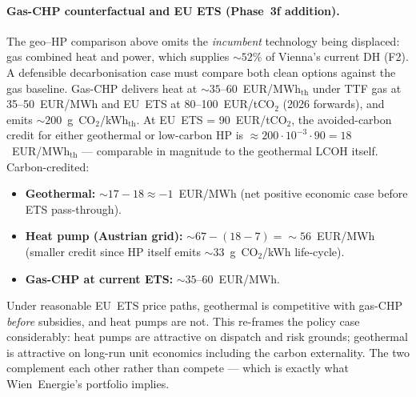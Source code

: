 \documentclass{article}
\begin{document}
\paragraph{Gas-CHP counterfactual and EU ETS (Phase~3f addition).}
The geo--HP comparison above omits the \emph{incumbent} technology
being displaced: gas combined heat and power, which supplies
$\sim 52\%$ of Vienna's current DH (F2). A defensible decarbonisation
case must compare both clean options against the gas baseline.
Gas-CHP delivers heat at $\sim 35$--$60$~EUR/MWh$_{\mathrm{th}}$
under TTF gas at 35--50~EUR/MWh and EU~ETS at 80--100~EUR/tCO$_2$
(2026 forwards), and emits $\sim 200$~g~CO$_2$/kWh$_{\mathrm{th}}$.
At EU~ETS = 90~EUR/tCO$_2$, the avoided-carbon credit for either
geothermal or low-carbon HP is $\approx 200 \cdot 10^{-3}
\cdot 90 = 18$~EUR/MWh$_{\mathrm{th}}$ --- comparable in magnitude
to the geothermal LCOH itself. Carbon-credited:
\begin{itemize}
\item \textbf{Geothermal:} $\sim 17 - 18 \approx -1$~EUR/MWh
(net positive economic case before ETS pass-through).
\item \textbf{Heat pump (Austrian grid):} $\sim 67 - (18 - 7) =
\sim 56$~EUR/MWh (smaller credit since HP itself emits
$\sim 33$~g~CO$_2$/kWh life-cycle).
\item \textbf{Gas-CHP at current ETS:} $\sim 35$--$60$~EUR/MWh.
\end{itemize}
Under reasonable EU~ETS price paths, geothermal is competitive
with gas-CHP \emph{before} subsidies, and heat pumps are not.
This re-frames the policy case considerably: heat pumps are
attractive on dispatch and risk grounds; geothermal is
attractive on long-run unit economics including the carbon
externality. The two complement each other rather than
compete --- which is exactly what Wien~Energie's portfolio
implies.
\end{document}
